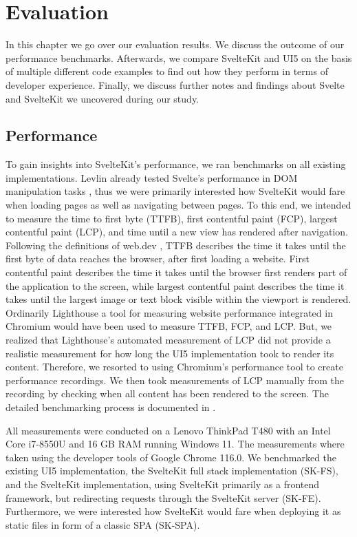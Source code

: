 \chapter{Evaluation}
\label{ch:evaluation}
In this chapter we go over our evaluation results. We discuss the outcome of our performance benchmarks. Afterwards, we compare SvelteKit and UI5 on the basis of multiple different code examples to find out how they perform in terms of developer experience. Finally, we discuss further notes and findings about Svelte and SvelteKit we uncovered during our study.

\section{Performance}
\label{sec:evaluation-performance}
To gain insights into SvelteKit's performance, we ran benchmarks on all existing implementations. Levlin already tested Svelte's performance in DOM manipulation tasks \cite{levlin_dom_2020}, thus we were primarily interested how SvelteKit would fare when loading pages as well as navigating between pages. To this end, we intended to measure the time to first byte (TTFB), first contentful paint (FCP), largest contentful paint (LCP), and time until a new view has rendered after navigation. Following the definitions of web.dev \cite{noauthor_webdev_nodate}, TTFB describes the time it takes until the first byte of data reaches the browser, after first loading a website. First contentful paint describes the time it takes until the browser first renders part of the application to the screen, while largest contentful paint describes the time it takes until the largest image or text block visible within the viewport is rendered. Ordinarily Lighthouse a tool for measuring website performance integrated in Chromium would have been used to measure TTFB, FCP, and LCP. But, we realized that Lighthouse's automated measurement of LCP did not provide a realistic measurement for how long the UI5 implementation took to render its content. Therefore, we resorted to using Chromium's performance tool to create performance recordings. We then took measurements of LCP manually from the recording by checking when all content has been rendered to the screen. The detailed benchmarking process is documented in .  

All measurements were conducted on a Lenovo ThinkPad T480 with an Intel Core i7-8550U and 16 GB RAM running Windows 11. The measurements where taken using the developer tools of Google Chrome 116.0. We benchmarked the existing UI5 implementation, the SvelteKit full stack implementation (SK-FS), and the SvelteKit implementation, using SvelteKit primarily as a frontend framework, but redirecting requests through the SvelteKit server (SK-FE). Furthermore, we were interested how SvelteKit would fare when deploying it as static files in form of a classic SPA (SK-SPA). 

